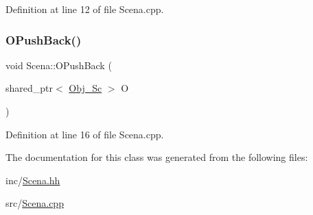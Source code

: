 Definition at line 12 of file Scena.\+cpp.

\mbox{\label{class_scena_adf77e0e73d6bc9aa0c8b0a27225aaa14}} 
\subsubsection{\texorpdfstring{O\+Push\+Back()}{OPushBack()}}
{\footnotesize\ttfamily void Scena\+::\+O\+Push\+Back (\begin{DoxyParamCaption}\item[{shared\+\_\+ptr$<$ \hyperlink{class_obj___sc}{Obj\+\_\+\+Sc} $>$}]{O }\end{DoxyParamCaption})}



Definition at line 16 of file Scena.\+cpp.



The documentation for this class was generated from the following files\+:\begin{DoxyCompactItemize}
\item 
inc/\hyperlink{_scena_8hh}{Scena.\+hh}\item 
src/\hyperlink{_scena_8cpp}{Scena.\+cpp}\end{DoxyCompactItemize}
